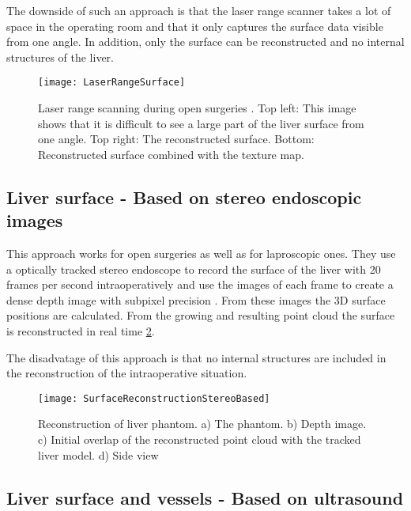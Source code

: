 The downside of such an approach is that the laser range scanner takes a lot of
space in the operating room and that it only captures the surface data visible
from one angle. In addition, only the surface can be reconstructed and no
internal structures of the liver.
\begin{figure}[H]
  \centering
 \texttt{[image: LaserRangeSurface]}
 \caption{Laser range scanning during open surgeries \cite{cash2007concepts}.
   Top left: This image shows that it is difficult to see a large part of the liver
   surface from one angle. Top right: The reconstructed surface. Bottom:
   Reconstructed surface combined with the texture map. }
  \label{fig:LaserRangeSurface}
\end{figure}

\subsection{Liver surface - Based on stereo endoscopic images}
This approach works for open surgeries as well as for laproscopic ones. They use
a optically tracked stereo endoscope to record the surface of the liver with 20 frames per second intraoperatively and use
the images of each frame to create a dense depth image with subpixel precision \cite{speidel2011intraoperative}.
From these images the 3D surface positions are calculated. From the growing and resulting
point cloud the surface is reconstructed in real time \ref{fig:SurfaceReconstructionStereoBased}.

The disadvatage of this approach is that no internal structures are included in
the reconstruction of the intraoperative situation.
\begin{figure}[H]
  \centering
 \texttt{[image: SurfaceReconstructionStereoBased]}
 \caption{Reconstruction of liver phantom. a) The phantom. b) Depth image. c)
   Initial overlap of the reconstructed point cloud with the tracked liver
   model. d) Side view \cite{speidel2011intraoperative}}
  \label{fig:SurfaceReconstructionStereoBased}
\end{figure}

\subsection{Liver surface and vessels - Based on ultrasound}


